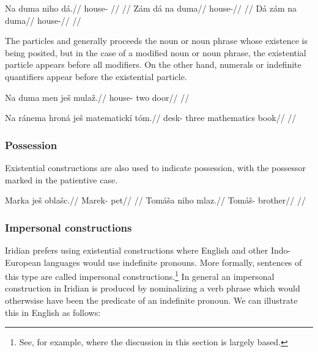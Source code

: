 \pex
\a\begingl
\gla Na duma niho dá.//
\glb \Loc{} house-\Acc{} \N{}\Exst{} //
\glft {}//
\endgl
\a\begingl
\gla Zám dá na duma//
\glb \Neg{}  \Loc{} house-\Acc{}//
\glft {}//
\endgl
\a\begingl
\gla Dá zám na duma//
\glb {} \Neg{} \Loc{} house-\Acc{}//
\glft {}//
\endgl
\xe

The particles  and  generally proceeds the noun or noun
phrase whose existence is being posited, but in the case of a modified noun or
noun phrase, the existential particle appears before all modifiers. On the other
hand, numerals or indefinite quantifiers appear before the existential particle.

\pex
\begingl
\gla Na duma men ješ mulaž.//
\glb \Loc{} house-\Acc{} two \Exst{} door//
\glft {}//
\endgl
\xe

\pex
\begingl
\gla Na ránema hroná ješ matematickí tóm.//
\glb \Loc{} desk-\Acc{} three \Exst{} mathematics book//
\glft {}//
\endgl
\xe




\subsubsection{Possession}
Existential constructions are also used to indicate possession, with the
possessor marked in the patientive case.

\begin{multicols}{2}
\pex
  \begingl
    \gla Marka ješ oblašc.//
    \glb Marek-\Acc{} \Exst{} pet//
    \glft {}//
  \endgl
\xe
\pex
  \begingl
    \gla Tomáša niho mlaz.//
    \glb Tomáš-\Acc{} \N{}\Exst{} brother//
    \glft {}//
  \endgl
\xe
\end{multicols}

\subsubsection{Impersonal constructions}

Iridian prefers using existential constructions where English and
other Indo-European languages would use indefinite pronouns. More formally,
sentences of this type are called impersonal constructions.\footnote{See, for
example, \textcite{lawtagalog} where the discussion in this section is largely
based.} In general an impersonal construction in Iridian is produced by
nominalizing a verb phrase which would otherwsise have
been the predicate of an indefinite pronoun. We can illustrate this in English
as follows:


